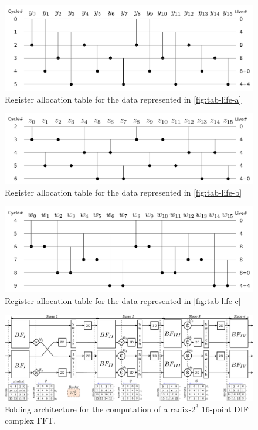 \documentclass[journal,comsoc]{IEEEtran}
\begin{document}
\begin{figure}[htbp]%
\centering
 \includegraphics[width=1\linewidth]{Diagramas/life_chart_a.png}%
\caption{Register allocation table for the data represented in \ref{fig:tab-life-a}}
\label{fig:tab-aloc-a}
\end{figure}

\begin{figure}[htbp]%
\centering
 \includegraphics[width=1\linewidth]{Diagramas/life_chart_b.png}%
\caption{Register allocation table for the data represented in \ref{fig:tab-life-b}}
\label{fig:tab-aloc-b}
\end{figure}

\begin{figure}[htbp]%
\centering
 \includegraphics[width=1\linewidth]{Diagramas/life_chart_c.png}%
\caption{Register allocation table for the data represented in \ref{fig:tab-life-c}}
\label{fig:tab-aloc-c}
\end{figure}

\begin{figure}[htbp]%
\centering
 \includegraphics[width=0.85\linewidth]{Diagramas/miSeccionFiguras/4Paralelo16pRadix8}%
\caption{Folding architecture for the computation of a radix-$2^3$ 16-point DIF complex FFT.}
\label{fig:circ-folding-16}
\end{figure}
\end{document}
